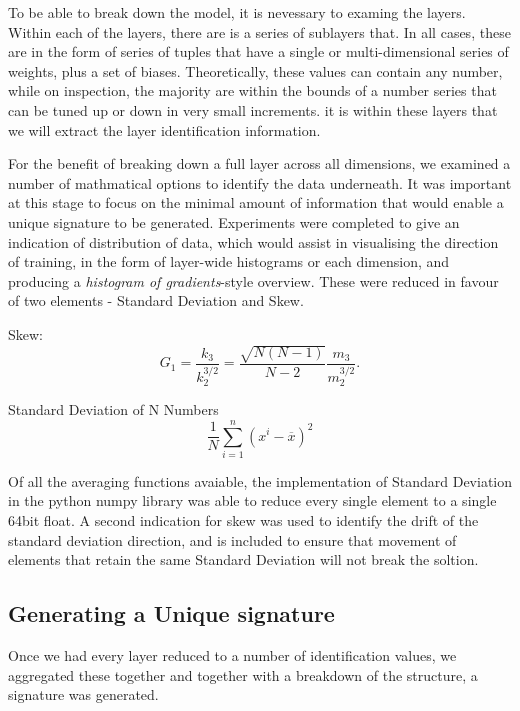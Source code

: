 To be able to break down the model, it is nevessary to examing the layers. Within each of the layers, there are is a series of sublayers that. In all cases, these are in the form of series of tuples that have a single or multi-dimensional series of weights, plus a set of biases. Theoretically, these values can contain any number, while on inspection, the majority are within the bounds of a number series that can be tuned up or down in very small increments. it is within these layers that we will extract the layer identification information. 

For the benefit of breaking down a full layer across all dimensions, we examined a number of mathmatical options to identify the data underneath. It was important at this stage to focus on the minimal amount of information that would enable a unique signature to be generated. Experiments were completed to give an indication of distribution of data, which would assist in visualising the direction of training, in the form of layer-wide histograms or each dimension, and producing a \textit{histogram of gradients}-style overview. These were reduced in favour of two elements - Standard Deviation and Skew.

Skew:
\[ G_1=\frac{k_3}{k_2^{3/2}}=\frac{\sqrt{N(N-1)}}{N-2}\frac{m_3}{m_2^{3/2}}. \]

Standard Deviation of N Numbers
\[ \frac1N\sum_{i=1}^n\left(x^i-\overline x\right)^2 \]

Of all the averaging functions avaiable, the implementation of Standard Deviation in the python numpy library was able to reduce every single element to a single 64bit float. A second indication for skew was used to identify the drift of the standard deviation direction, and is included to ensure that movement of elements that retain the same Standard Deviation will not break the soltion.

\subsection{Generating a Unique signature}
Once we had every layer reduced to a number of identification values, we aggregated these together and together with a breakdown of the structure, a signature was generated. 

